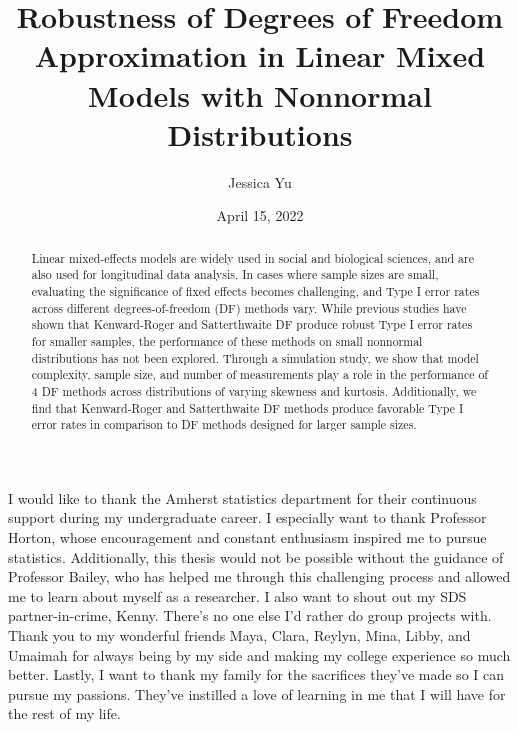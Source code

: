 \documentclass[12pt, twoside]{amherstthesis}
\title{Robustness of Degrees of Freedom Approximation in Linear Mixed Models with Nonnormal Distributions}
\author{Jessica Yu}
\date{April 15, 2022}
\begin{document}
\doublespace
  \maketitle

\frontmatter %
\pagestyle{fancyplain}

  \begin{abstract}
    Linear mixed-effects models are widely used in social and biological sciences, and are also used for longitudinal data analysis. In cases where sample sizes are small, evaluating the significance of fixed effects becomes challenging, and Type I error rates across different degrees-of-freedom (DF) methods vary. While previous studies have shown that Kenward-Roger and Satterthwaite DF produce robust Type I error rates for smaller samples, the performance of these methods on small nonnormal distributions has not been explored. Through a simulation study, we show that model complexity, sample size, and number of measurements play a role in the performance of 4 DF methods across distributions of varying skewness and kurtosis. Additionally, we find that Kenward-Roger and Satterthwaite DF methods produce favorable Type I error rates in comparison to DF methods designed for larger sample sizes.
  \end{abstract}
  \begin{acknowledgments}
    I would like to thank the Amherst statistics department for their continuous support during my undergraduate career. I especially want to thank Professor Horton, whose encouragement and constant enthusiasm inspired me to pursue statistics. Additionally, this thesis would not be possible without the guidance of Professor Bailey, who has helped me through this challenging process and allowed me to learn about myself as a researcher. I also want to shout out my SDS partner-in-crime, Kenny. There's no one else I'd rather do group projects with. Thank you to my wonderful friends Maya, Clara, Reylyn, Mina, Libby, and Umaimah for always being by my side and making my college experience so much better. Lastly, I want to thank my family for the sacrifices they've made so I can pursue my passions. They've instilled a love of learning in me that I will have for the rest of my life.
  \end{acknowledgments}

  \hypersetup{linkcolor=black}
  \setcounter{tocdepth}{2}
  \tableofcontents
\end{document}

